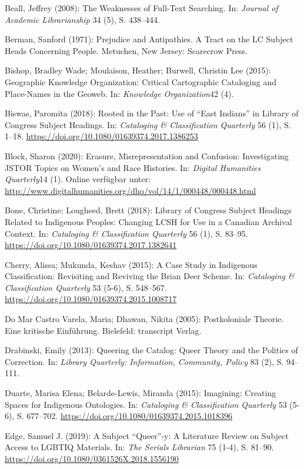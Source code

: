 \documentclass[a4paper,
fontsize=11pt,
oneside,
numbers=noperiodatend,
parskip=half-,
bibliography=totoc,
final
]{scrartcl}
\begin{document}
Beall, Jeffrey (2008): The Weaknesses of Full-Text Searching. In:
\emph{Journal of Academic Librarianship} 34 (5), S. 438--444.

Berman, Sanford (1971): Prejudice and Antipathies. A Tract on the LC
Subject Heads Concerning People. Metuchen, New Jersey: Scarecrow Press.

Bishop, Bradley Wade; Moulaison, Heather; Burwell, Christin Lee (2015):
Geographic Knowledge Organization: Critical Cartographic Cataloging and
Place-Names in the Geoweb. In: \emph{Knowledge Organization}42 (4).

Biswas, Paromita (2018): Rooted in the Past: Use of \enquote{East
Indians} in Library of Congress Subject Headings. In: \emph{Cataloging
\& Classification Quarterly} 56 (1), S. 1--18.
\url{https://doi.org/10.1080/01639374.2017.1386253}

Block, Sharon (2020): Erasure, Misrepresentation and Confusion:
Investigating JSTOR Topics on Women's and Race Histories. In:
\emph{Digital Humanities Quarterly}14 (1). Online verfügbar unter:
\url{http://www.digitalhumanities.org/dhq/vol/14/1/000448/000448.html}

Bone, Christine; Lougheed, Brett (2018): Library of Congress Subject
Headings Related to Indigenous Peoples: Changing LCSH for Use in a
Canadian Archival Context. In: \emph{Cataloging \& Classification
Quarterly} 56 (1), S. 83--95.
\url{https://doi.org/10.1080/01639374.2017.1382641}

Cherry, Alissa; Mukunda, Keshav (2015): A Case Study in Indigenous
Classification: Revisiting and Reviving the Brian Deer Scheme. In:
\emph{Cataloging \& Classification Quarterly} 53 (5-6), S. 548--567.
\url{https://doi.org/10.1080/01639374.2015.1008717}

Do Mar Castro Varela, Maria; Dhawan, Nikita (2005): Postkoloniale
Theorie. Eine kritische Einführung. Bielefeld: transcript Verlag.

Drabinski, Emily (2013): Queering the Catalog: Queer Theory and the
Politics of Correction. In: \emph{Library Quarterly: Information,
Community, Policy} 83 (2), S. 94--111.

Duarte, Marisa Elena; Belarde-Lewis, Miranda (2015): Imagining: Creating
Spaces for Indigenous Ontologies. In: \emph{Cataloging \& Classification
Quarterly} 53 (5-6), S. 677--702.
\url{https://doi.org/10.1080/01639374.2015.1018396}

Edge, Samuel J. (2019): A Subject \enquote{Queer}-y: A Literature Review
on Subject Access to LGBTIQ Materials. In: \emph{The Serials Librarian}
75 (1-4), S. 81--90. \url{https://doi.org/10.1080/0361526X.2018.1556190}
\end{document}
